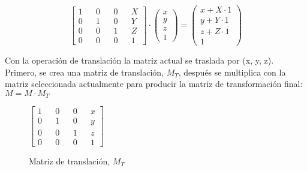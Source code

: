 \begin{minipage}{0.3\textwidth}
  \centering
\end{minipage}\begin{minipage}{0.5\textwidth}
  \centering
  \[
  \begin{bmatrix}
    1 && 0 && 0 && X\\
    0 && 1 && 0 && Y\\
    0 && 0 && 1 && Z\\
    0 && 0 && 0 && 1
  \end{bmatrix}
  \cdot
  \begin{pmatrix}
    x \\ y \\ z \\ 1
  \end{pmatrix}
  =
  \begin{pmatrix}
    x + X \cdot 1 \\
    y + Y \cdot 1 \\
    z + Z \cdot 1 \\
    1
  \end{pmatrix}
  \]
\end{minipage}

Con la operación de translación la matriz actual se traslada por (x, y, z). Primero, se crea una matriz de translación, $M_T$, después se multiplica con la matriz seleccionada actualmente para producir la matriz de transformación final: $M = M \cdot M_T$
\begin{figure} [h!]
  \centering
  \(
  \begin{bmatrix}
    1 && 0 && 0 && x\\
    0 && 1 && 0 && y\\
    0 && 0 && 1 && z\\
    0 && 0 && 0 && 1
  \end{bmatrix}
  \)
  \caption{Matriz de translación, $M_T$}
\end{figure}

